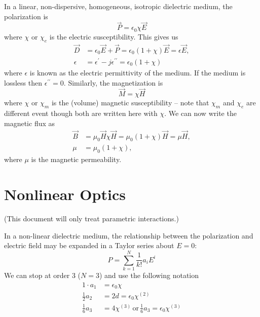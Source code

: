 \documentclass{article}
\begin{document}
In a linear, non-dispersive, homogeneous, isotropic dielectric medium, the polarization is
\begin{equation}
	\vec{P}=\epsilon_0\chi\vec{E}
\end{equation}
where $\chi$ or $\chi_e$ is the electric susceptibility. This gives us
\begin{align}
	\vec{D}&=\epsilon_0\vec{E}+\vec{P}=\epsilon_0(1+\chi)\vec{E}=\epsilon\vec{E},\\
	\epsilon&=\epsilon^\prime-j\epsilon^{\prime\prime}=\epsilon_0(1+\chi)
\end{align}
where $\epsilon$ is known as the electric permittivity of the medium. If the medium is lossless then $\epsilon^{\prime\prime}=0$. Similarly, the magnetization is
\begin{equation}
	\vec{M}=\chi\vec{H}
\end{equation}
where $\chi$ or $\chi_m$ is the (volume) magnetic susceptibility -- note that $\chi_m$ and $\chi_e$ are different event though both are written here with $\chi$. We can now write the magnetic flux as
\begin{align}
	\vec{B}&=\mu_0\vec{H}\chi\vec{H}=\mu_0(1+\chi)\vec{H}=\mu\vec{H},\\
	\mu&=\mu_0(1+\chi),
\end{align}
where $\mu$ is the magnetic permeability.

	\section{Nonlinear Optics}

(This document will only treat parametric interactions.)

In a non-linear dielectric medium, the relationship between the polarization and electric field may be expanded in a Taylor series about $E=0$:
\begin{equation}
	P=\sum_{k=1}^N{\frac{1}{k!}a_iE^i}
\end{equation}
We can stop at order 3 ($N=3$) and use the following notation
\begin{align}
	1\cdot{a_1}&=\epsilon_0\chi\\
	\frac{1}{2}a_2&=2d=\epsilon_0\chi^{(2)}\\
	\frac{1}{6}a_3&=4\chi^{(3)}\,\mathrm{or}\,\frac{1}{6}a_3=\epsilon_0\chi^{(3)}
\end{align}
\end{document}
